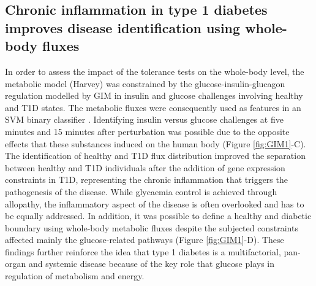 \subsection{Chronic inflammation in type 1 diabetes improves disease identification using whole-body fluxes}
In order to assess the impact of the tolerance tests on the whole-body level, the metabolic model (Harvey) was constrained by the glucose-insulin-glucagon regulation modelled by GIM in insulin and glucose challenges involving healthy and T1D states. The metabolic fluxes were consequently used as features in an SVM binary classifier \cite{shaked2016metabolic}. Identifying insulin versus glucose challenges at five minutes and 15 minutes after perturbation was possible due to the opposite effects that these substances induced on the human body (Figure \ref{fig:GIM1}-C). The identification of healthy and T1D flux distribution improved the separation between healthy and T1D individuals after the addition of gene expression constraints in T1D, representing the chronic inflammation that triggers the pathogenesis of the disease. While glycaemia control is achieved through allopathy, the inflammatory aspect of the disease is often overlooked \cite{mccall2013treating} and has to be equally addressed. In addition, it was possible to define a healthy and diabetic boundary using whole-body metabolic fluxes despite the subjected constraints affected mainly the glucose-related pathways (Figure \ref{fig:GIM1}-D). These findings further reinforce the idea that type 1 diabetes is a multifactorial, pan-organ and systemic disease because of the key role that glucose plays in regulation of metabolism and energy.
